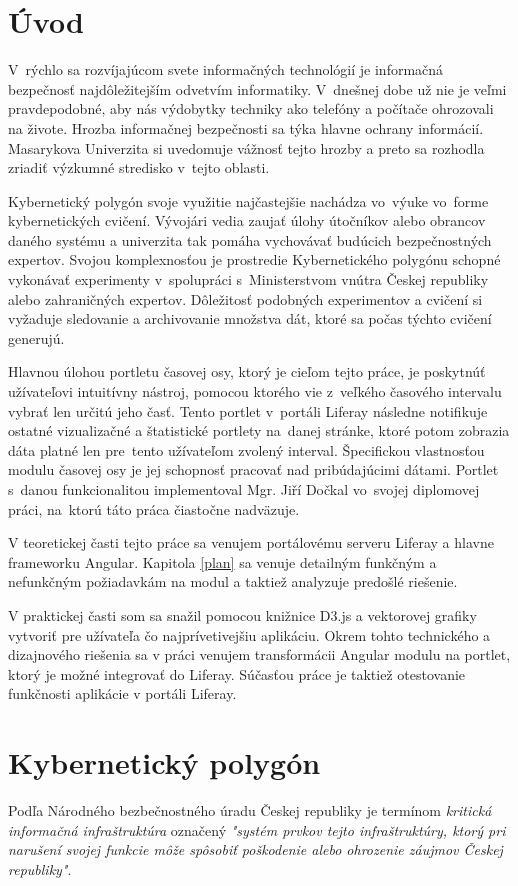 \documentclass[
  printed, %
  twoside, %
  notable,   %
  nolof,   %
  nolot,   %
]{fithesis3}
\begin{document}
\chapter*{Úvod}
V~rýchlo sa rozvíjajúcom svete informačných technológií je informačná bezpečnosť najdôležitejším odvetvím informatiky. V~dnešnej dobe už nie je veľmi pravdepodobné, aby nás výdobytky techniky ako telefóny a počítače ohrozovali na živote. Hrozba informačnej bezpečnosti sa týka hlavne ochrany informácií. Masarykova Univerzita si uvedomuje vážnosť tejto hrozby a preto sa rozhodla zriadiť výzkumné stredisko v~tejto oblasti.

Kybernetický polygón svoje využitie najčastejšie nachádza vo~výuke vo~forme kybernetických cvičení. Vývojári vedia zaujať úlohy útočníkov alebo obrancov daného systému a univerzita tak pomáha vychovávať budúcich bezpečnostných expertov. Svojou komplexnosťou je prostredie Kybernetického polygónu schopné vykonávať experimenty v~spolupráci s~Ministerstvom vnútra Českej republiky alebo zahraničných expertov. Dôležitosť podobných experimentov a cvičení si vyžaduje sledovanie a archivovanie množstva dát, ktoré sa počas týchto cvičení generujú.

Hlavnou úlohou portletu časovej osy, ktorý je cieľom tejto práce, je poskytnúť užívateľovi intuitívny nástroj, pomocou ktorého vie z~veľkého časového intervalu vybrať len určitú jeho časť. Tento portlet v~portáli Liferay následne notifikuje ostatné vizualizačné a štatistické portlety na~danej stránke, ktoré potom zobrazia dáta platné len pre~tento užívateľom zvolený interval. Špecifickou vlastnosťou modulu časovej osy je jej schopnosť pracovať nad pribúdajúcimi dátami. Portlet s~danou funkcionalitou implementoval Mgr. Jiří Dočkal vo~svojej diplomovej práci, na~ktorú táto práca čiastočne nadväzuje.

V teoretickej časti tejto práce sa venujem portálovému serveru Liferay a hlavne frameworku Angular. Kapitola \ref{plan} sa venuje detailným funkčným a nefunkčným požiadavkám na modul a taktiež analyzuje predošlé riešenie.

V praktickej časti som sa snažil pomocou knižnice D3.js a vektorovej grafiky vytvoriť pre užívateľa čo najprívetivejšiu aplikáciu. Okrem tohto technického a dizajnového riešenia sa v práci venujem transformácii Angular modulu na portlet, ktorý je možné integrovať do Liferay. Súčasťou práce je taktiež otestovanie funkčnosti aplikácie v portáli Liferay.

\chapter{Kybernetický polygón}
Podľa Národného bezbečnostného úradu Českej republiky je termínom \textit{kritická informačná infraštruktúra} označený \textit{"systém prvkov tejto infraštruktúry, ktorý pri narušení svojej funkcie môže spôsobiť poškodenie alebo ohrozenie záujmov Českej republiky"}\cite{nbu2012}.
\end{document}
